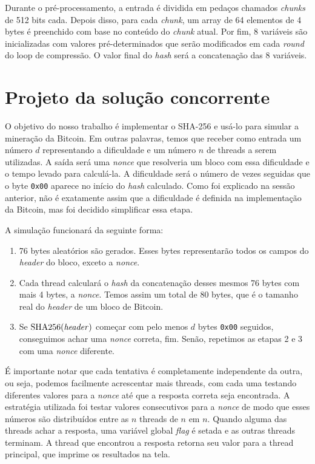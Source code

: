 \documentclass[12pt]{article}
\DeclareMathOperator{\sha}{SHA256}
\begin{document}
Durante o pré-processamento,
a entrada é dividida em
pedaços chamados \textit{chunks} de 512 bits cada.
Depois disso, para cada \textit{chunk},
um array de 64 elementos de 4 bytes é
preenchido com base no conteúdo do \textit{chunk} atual.
Por fim, 8 variáveis são inicializadas com valores pré-determinados
que serão modificados em cada \textit{round} do loop de compressão.
O valor final do \textit{hash} será a concatenação das 8 variáveis.

\section{Projeto da solução concorrente}
O objetivo do nosso trabalho é
implementar o SHA-256 e
usá-lo para simular a mineração da Bitcoin.
Em outras palavras,
temos que receber como entrada
um número $d$ representando a dificuldade e
um número $n$ de threads a serem utilizadas.
A saída será uma \textit{nonce} que
resolveria um bloco com essa dificuldade e
o tempo levado para calculá-la.
A dificuldade será o número de vezes seguidas 
que o byte \texttt{0x00} aparece no
início do \textit{hash} calculado.
Como foi explicado na sessão anterior,
não é exatamente assim que a dificuldade é definida
na implementação da Bitcoin,
mas foi decidido simplificar essa etapa.

A simulação funcionará da seguinte forma:
\begin{enumerate}
	\item 76 bytes aleatórios são gerados.
		Esses bytes representarão todos os campos
		do \textit{header} do bloco,
		exceto a \textit{nonce}.
	\item Cada thread calculará o \textit{hash} da concatenação
		desses mesmos 76 bytes com mais 4 bytes, a \textit{nonce}.
		Temos assim um total de 80 bytes,
		que é o tamanho real do \textit{header} de
		um bloco de Bitcoin.
	\item Se $\sha(\text{\textit{header}})$
		começar com pelo menos $d$ bytes \texttt{0x00} seguidos,
		conseguimos achar uma \textit{nonce} correta, fim.
		Senão, repetimos as etapas 2 e 3
		com uma \textit{nonce} diferente.
\end{enumerate}

É importante notar que cada tentativa
é completamente independente da outra, ou seja,
podemos facilmente acrescentar mais threads,
com cada uma testando diferentes valores para a \textit{nonce}
até que a resposta correta seja encontrada.
A estratégia utilizada foi
testar valores consecutivos para a \textit{nonce}
de modo que esses números são distribuídos
entre as $n$ threads de $n$ em $n$.
Quando alguma das threads achar a resposta,
uma variável global \textit{flag} é setada
e as outras threads terminam.
A thread que encontrou a resposta
retorna seu valor para a thread principal,
que imprime os resultados na tela.
\end{document}
